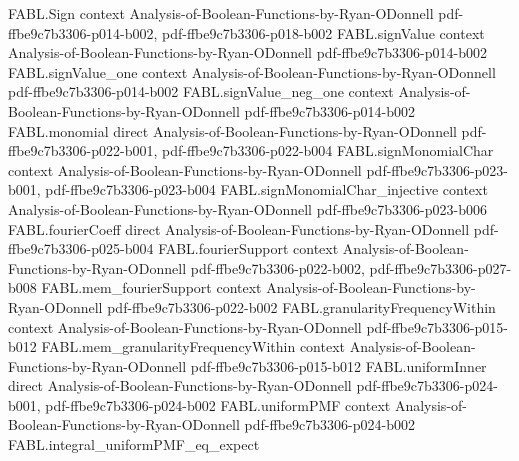 \begin{theorem}
\label{FABL.productCovariance_uniformSign}
\leanok
{}
\proofstep
  {FABL.Sign}
  {context}
  {Analysis-of-Boolean-Functions-by-Ryan-ODonnell}
  {pdf-ffbe9c7b3306-p014-b002,
    pdf-ffbe9c7b3306-p018-b002}
\proofstep
  {FABL.signValue}
  {context}
  {Analysis-of-Boolean-Functions-by-Ryan-ODonnell}
  {pdf-ffbe9c7b3306-p014-b002}
\proofstep
  {FABL.signValue_one}
  {context}
  {Analysis-of-Boolean-Functions-by-Ryan-ODonnell}
  {pdf-ffbe9c7b3306-p014-b002}
\proofstep
  {FABL.signValue_neg_one}
  {context}
  {Analysis-of-Boolean-Functions-by-Ryan-ODonnell}
  {pdf-ffbe9c7b3306-p014-b002}
\proofstep
  {FABL.monomial}
  {direct}
  {Analysis-of-Boolean-Functions-by-Ryan-ODonnell}
  {pdf-ffbe9c7b3306-p022-b001,
    pdf-ffbe9c7b3306-p022-b004}
\proofstep
  {FABL.signMonomialChar}
  {context}
  {Analysis-of-Boolean-Functions-by-Ryan-ODonnell}
  {pdf-ffbe9c7b3306-p023-b001,
    pdf-ffbe9c7b3306-p023-b004}
\proofstep
  {FABL.signMonomialChar_injective}
  {context}
  {Analysis-of-Boolean-Functions-by-Ryan-ODonnell}
  {pdf-ffbe9c7b3306-p023-b006}
\proofstep
  {FABL.fourierCoeff}
  {direct}
  {Analysis-of-Boolean-Functions-by-Ryan-ODonnell}
  {pdf-ffbe9c7b3306-p025-b004}
\proofstep
  {FABL.fourierSupport}
  {context}
  {Analysis-of-Boolean-Functions-by-Ryan-ODonnell}
  {pdf-ffbe9c7b3306-p022-b002,
    pdf-ffbe9c7b3306-p027-b008}
\proofstep
  {FABL.mem_fourierSupport}
  {context}
  {Analysis-of-Boolean-Functions-by-Ryan-ODonnell}
  {pdf-ffbe9c7b3306-p022-b002}
\proofstep
  {FABL.granularityFrequencyWithin}
  {context}
  {Analysis-of-Boolean-Functions-by-Ryan-ODonnell}
  {pdf-ffbe9c7b3306-p015-b012}
\proofstep
  {FABL.mem_granularityFrequencyWithin}
  {context}
  {Analysis-of-Boolean-Functions-by-Ryan-ODonnell}
  {pdf-ffbe9c7b3306-p015-b012}
\proofstep
  {FABL.uniformInner}
  {direct}
  {Analysis-of-Boolean-Functions-by-Ryan-ODonnell}
  {pdf-ffbe9c7b3306-p024-b001,
    pdf-ffbe9c7b3306-p024-b002}
\proofstep
  {FABL.uniformPMF}
  {context}
  {Analysis-of-Boolean-Functions-by-Ryan-ODonnell}
  {pdf-ffbe9c7b3306-p024-b002}
\proofstep
  {FABL.integral_uniformPMF_eq_expect}

\end{theorem}
